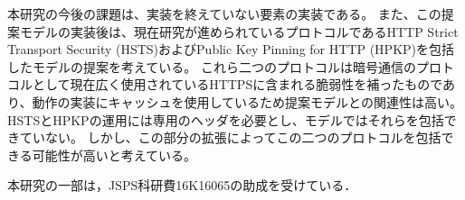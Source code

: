 \documentclass{css}
\begin{document}
本研究の今後の課題は、実装を終えていない要素の実装である。
また、この提案モデルの実装後は、現在研究が進められているプロトコルであるHTTP Strict Transport Security (HSTS)\cite{rfc6797}およびPublic Key Pinning for HTTP (HPKP)\cite{rfc7469}を包括したモデルの提案を考えている。
これら二つのプロトコルは暗号通信のプロトコルとして現在広く使用されているHTTPSに含まれる脆弱性を補ったものであり、動作の実装にキャッシュを使用しているため提案モデルとの関連性は高い。
HSTSとHPKPの運用には専用のヘッダを必要とし、モデルではそれらを包括できていない。
しかし、この部分の拡張によってこの二つのプロトコルを包括できる可能性が高いと考えている。

\begin{acknowledgment}
本研究の一部は，JSPS科研費16K16065の助成を受けている．
\end{acknowledgment}



\end{document}
